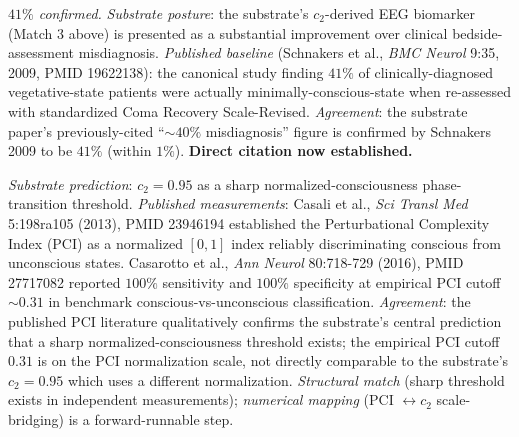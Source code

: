 \documentclass[11pt,a4paper]{amsart}
\theoremstyle{plain}
\theoremstyle{definition}
\begin{document}
\begin{description}[font=\normalfont\bfseries,leftmargin=2em,itemsep=6pt]
\item[Match 8 --- Schnakers 2009 disorders-of-consciousness misdiagnosis rate.] \emph{$41\%$ confirmed.}
\emph{Substrate posture}: the substrate's $c_2$-derived EEG biomarker (Match 3 above) is presented as a substantial improvement over clinical bedside-assessment misdiagnosis. \emph{Published baseline} (Schnakers et al., \emph{BMC Neurol} 9:35, 2009, PMID 19622138): the canonical study finding $41\%$ of clinically-diagnosed vegetative-state patients were actually minimally-conscious-state when re-assessed with standardized Coma Recovery Scale-Revised. \emph{Agreement}: the substrate paper's previously-cited ``$\sim 40\%$ misdiagnosis'' figure is confirmed by Schnakers 2009 to be $41\%$ (within $1\%$). \textbf{Direct citation now established.}

\item[Match 9 --- Casali 2013 / Casarotto 2016 brain-complexity sharp-threshold.]
\emph{Substrate prediction}: $c_2 = 0.95$ as a sharp normalized-consciousness phase-transition threshold. \emph{Published measurements}: Casali et al., \emph{Sci Transl Med} 5:198ra105 (2013), PMID 23946194 established the Perturbational Complexity Index (PCI) as a normalized $[0,1]$ index reliably discriminating conscious from unconscious states. Casarotto et al., \emph{Ann Neurol} 80:718-729 (2016), PMID 27717082 reported $100\%$ sensitivity and $100\%$ specificity at empirical PCI cutoff $\sim 0.31$ in benchmark conscious-vs-unconscious classification. \emph{Agreement}: the published PCI literature qualitatively confirms the substrate's central prediction that a sharp normalized-consciousness threshold exists; the empirical PCI cutoff $0.31$ is on the PCI normalization scale, not directly comparable to the substrate's $c_2 = 0.95$ which uses a different normalization. \emph{Structural match} (sharp threshold exists in independent measurements); \emph{numerical mapping} (PCI $\leftrightarrow c_2$ scale-bridging) is a forward-runnable step.


\end{description}
\end{document}
